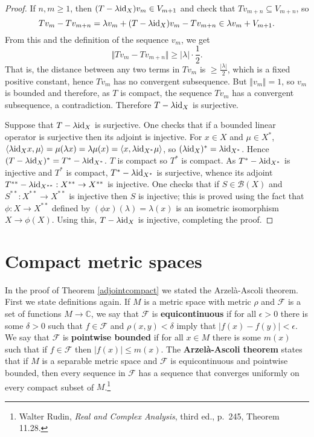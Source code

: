 \documentclass{article}
\newcommand{\inner}[2]{\langle #1, #2 \rangle}
\newcommand{\id}{\ensuremath\mathrm{id}}
\newcommand{\norm}[1]{\Vert #1 \Vert}
\begin{document}
\begin{proof}
If $n,m \geq 1$, then $(T-\lambda \id_X)v_m \in V_{m+1}$ and check that $Tv_{m+n} \subseteq V_{m+n}$, so
\[
Tv_m-Tv_{m+n} = \lambda v_m + (T-\lambda \id_X)v_m - Tv_{m+n} \in \lambda v_m + V_{m+1}.
\]
From this and the definition of the sequence $v_m$, we get
\[
\norm{Tv_m - Tv_{m+n}} \geq |\lambda| \cdot \frac{1}{2}.
\]
That is, the distance between any two terms in $Tv_m$ is $\geq \frac{|\lambda|}{2}$, which is a fixed positive constant, hence $Tv_m$
has no convergent subsequence. But $\norm{v_m}=1$, so $v_m$ is bounded and therefore, as $T$ is compact, the sequence
$Tv_m$ has a convergent subsequence, a contradiction. Therefore $T-\lambda \id_X$ is surjective.

Suppose that $T-\lambda \id_X$ is surjective. One checks that if a bounded linear operator
is surjective then its adjoint is injective. For $x \in X$ and $\mu \in X^*$, 
$\inner{\lambda \id_X x}{\mu}=\mu(\lambda x)=\lambda \mu(x)=\inner{x}{\lambda \id_{X^*} \mu}$, so
$(\lambda \id_X)^* = \lambda \id_{X^*}$. Hence $(T-\lambda \id_X)^* = T^* - \lambda \id_{X^*}$. $T$ is compact
so $T^*$ is compact. As $T^* - \lambda \id_{X^*}$ is injective and $T^*$ is compact, $T^*-\lambda \id_{X^*}$ is surjective,
whence its adjoint $T^{**} - \lambda \id_{X^{**}}:X^{**} \to X^{**}$ is injective. One  checks that if $S \in \mathscr{B}(X)$ and 
$S^{**}:X^{**} \to X^{**}$ is injective then $S$ is injective; this is proved using the fact that
$\phi:X \to X^{**}$ defined by $(\phi x)(\lambda)=\lambda(x)$ is an isometric isomorphism
$X \to \phi(X)$. Using this, $T-\lambda \id_X$ is injective, completing the proof.
\end{proof}



\section{Compact metric spaces}
In the proof of Theorem \ref{adjointcompact} we stated the Arzel\`a-Ascoli theorem. 
First we state definitions again. If $M$ is a metric space with metric $\rho$ and $\mathcal{F}$ is a set of functions
$M \to \mathbb{C}$, we say that $\mathcal{F}$ is \textbf{equicontinuous} if for all $\epsilon>0$ there is some $\delta>0$
such that $f \in \mathcal{F}$ and $\rho(x,y)<\delta$ imply that $|f(x)-f(y)|<\epsilon$. We say that $\mathcal{F}$ is \textbf{pointwise bounded}
if for all $x \in M$ there is some $m(x)$ such that if $f \in \mathcal{F}$ then $|f(x)| \leq m(x)$. The \textbf{Arzel\`a-Ascoli theorem} states that
if $M$ is a separable metric space and $\mathcal{F}$ is  equicontinuous and pointwise bounded, then every sequence in $\mathcal{F}$ has a sequence
that converges uniformly on every compact subset of $M$.\footnote{Walter Rudin, {\em Real and Complex Analysis}, third ed., p.~245, Theorem 11.28.}
\end{document}

